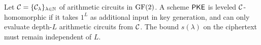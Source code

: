 \begin{definition}
\label{def:leveled}
Let $\mathcal{C} = \{\mathcal{C}_{\lambda}\}_{\lambda\in\mathbb{N}}$ of arithmetic circuits in $\text{GF}(2)$. A scheme 
$\mathsf{PKE}$ is leveled  $\mathcal{C}$-homomorphic if it takes $1^L$ as additional input in 
key generation, and can only evaluate depth-$L$ arithmetic circuits from 
$\mathcal{C}$. The bound $s(\lambda)$ on the ciphertext must remain independent of 
$L$.
\end{definition}
